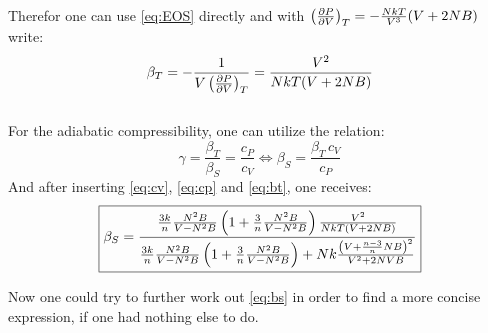 \documentclass[11pt,a4paper]{scrartcl}
\newcommand{\thermpart}[3]{\left(\pdv{#1}{#2}\right)_{#3}}
\begin{document}
\begin{enumerate}[label=\textbf{\large(\alph*)}, itemsep=2\baselineskip]
    Therefor one can use \eqref{eq:EOS} directly and with
    $\thermpart{P}{V}{T}=-\frac{NkT}{V^3}(V+2NB)$ write:
    \begin{equation}
        \beta_{T}=-\frac{1}{V\thermpart{P}{V}{T}}=\frac{V^2}{NkT(V+2NB)}
        \label{eq:bt}
    \end{equation} \\

    For the adiabatic compressibility, one can utilize the relation:
    \begin{equation*}
        \gamma=\frac{\beta_{T}}{\beta_{S}}=\frac{c_{P}}{c_{V}}\iff\beta_{S}=\frac{\beta_{T}\,c_{V}}{c_{P}}
    \end{equation*}
    And after inserting \eqref{eq:cv}, \eqref{eq:cp} and \eqref{eq:bt}, one
    receives:
    \begin{equation}
        \boxed{%
        \beta_{S}=\frac{\frac{3k}{n}\frac{N^2B}{V-N^2B}\left(1+\frac{3}{n}\frac{N^2B}{V-N^2B}\right)\frac{V^2}{NkT(V+2NB)}}
        {\frac{3k}{n}\frac{N^2B}{V-N^2B}\left(1+\frac{3}{n}\frac{N^2B}{V-N^2B}\right)+Nk\frac{\left(V+\frac{n-3}{n}NB\right)^2}{V^2+2NVB}}
        }
        \label{eq:bs}
    \end{equation}

    Now one could try to further work out \eqref{eq:bs} in order to find a more
    concise expression, if one had nothing else to do.

\end{enumerate}
\end{document}
